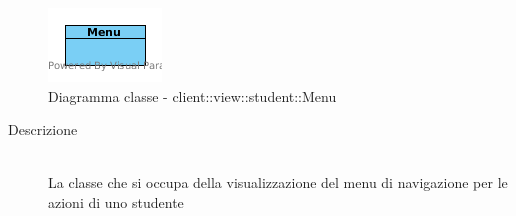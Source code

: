 \begin{center}
			\begin{figure}[H]
				\centering \includegraphics[scale=4, max width=\textwidth, max height=\myheight]{../img/diagrammiClassi/client/view/student/Menu.png}
				\caption{Diagramma classe - client::view::student::Menu}
			\end{figure}
		\end{center}\begin{description}
\item[Descrizione] \hfill \\
 La classe che si occupa della visualizzazione del menu di navigazione per le azioni di uno studente
\end{description}

